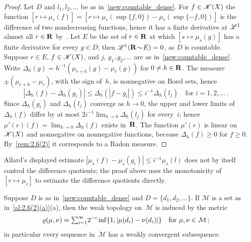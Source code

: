 \begin{proof}
    Let $D$ and $l_1, l_2, \ldots$ be as in~\ref{new:countable_dense}. For $f \in \mathscr{K}(X)$
    the function $[r \mapsto \mu_r(f)] = [r \mapsto \mu_r(\sup\{f,0\}) - \mu_r(\sup\{-f,0\})]$
    is the difference of two nondecreasing functions, hence it has a finite derivative at
    $\mathscr{L}^1$ almost all $r \in \mathbf{R}$ by~\cite[2.9.19]{Federer1969}. Let $E$ be the set of $r \in
    \mathbf{R}$ at which $[s \mapsto \mu_s(g)]$ has a finite derivative for every $g \in D$; then
    $\mathscr{L}^1(\mathbf{R} \!\sim\! E) = 0$, as $D$ is countable. Suppose $r \in E$, $f \in \mathscr{K}(X)$, and
    $j$, $g_1, g_2, \ldots$ are as in~\ref{new:countable_dense}. Write $\Delta_h(g) = h^{-1}
    (\mu_{r+h}(g) - \mu_r(g))$ for $0 \ne h \in \mathbf{R}$. The measure $\pm(\mu_{r+h} - \mu_r)$, with
    the sign of~$h$, is nonnegative on Borel sets, hence
    \begin{displaymath}
        |\Delta_h(f) - \Delta_h(g_i)| \le \Delta_h(|f - g_i|) \le i^{-1} \Delta_h(l_j)
        \quad \text{for $i = 1, 2, \ldots$} \,.
    \end{displaymath}
    Since $\Delta_h(g_i)$ and $\Delta_h(l_j)$ converge as $h \to 0$, the upper and lower limits
    of $\Delta_h(f)$ differ by at most $2 i^{-1} \lim_{h \to 0} \Delta_h(l_j)$ for every~$i$;
    hence $\mu'(r)(f) = \lim_{h \to 0} \Delta_h(f)$ exists in~$\mathbf{R}$. The function $\mu'(r)$ is
    linear on $\mathscr{K}(X)$ and nonnegative on nonnegative functions, because $\Delta_h(f) \ge
    0$ for $f \ge 0$. By~\ref{rem:2.6(2)} it corresponds to a Radon measure.
\end{proof}

\begin{remark}
    \label{rem:2.6(3)}
    Allard's displayed estimate $|\mu_s(f) - \mu_s(g_i)| \le i^{-1} \mu_s(l)$ does not by itself
    control the difference quotients; the proof above uses the monotonicity of $[r \mapsto
    \mu_r]$ to estimate the difference quotients directly.
\end{remark}

\begin{lemma}[new\MS]
    \label{new:weak_metric}
    Suppose $D$ is as in~\ref{new:countable_dense} and $D = \{ d_1, d_2, \ldots \}$. If $\mathcal{M}$ is
    a set as in~\ref{al:2.6(2)(a)}(a), then the weak topology on~$\mathcal{M}$ is induced by the
    metric
    \begin{displaymath}
        \varrho(\mu,\nu) = {\textstyle\sum_{i=1}^{\infty}} 2^{-i} \inf \{ 1, |\mu(d_i) - \nu(d_i)| \} \quad
        \text{for $\mu, \nu \in \mathcal{M}$} \,;
    \end{displaymath}
    in particular every sequence in~$\mathcal{M}$ has a weakly convergent subsequence.
\end{lemma}

